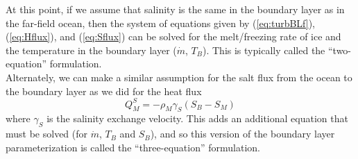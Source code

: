 \documentclass[12pt]{article}
\theoremstyle{definition}
\begin{document}
\begin{shaded}
At this point, if we assume that salinity is the same in the boundary layer as in the far-field ocean, then the system of equations given by (\ref{eq:turbBLf}), (\ref{eq:Hflux}), and (\ref{eq:Sflux}) can be solved for the melt/freezing rate of ice and the temperature in the boundary layer ($\dot{m}$, $T_B$). This is typically called the ``two-equation'' formulation. \\
Alternately, we can make a similar assumption for the salt flux from the ocean to the boundary layer as we did for the heat flux
\begin{equation} \label{eq:turbBLfS} Q_M^S = - \rho_M \gamma_S \left(S_B-S_M \right) \end{equation}
where $\gamma_S$ is the salinity exchange velocity. This adds an additional equation that must be solved (for $\dot{m}$, $T_B$ and $S_B$), and so this version of the boundary layer parameterization is called the ``three-equation'' formulation.
\end{shaded}



\end{document}
